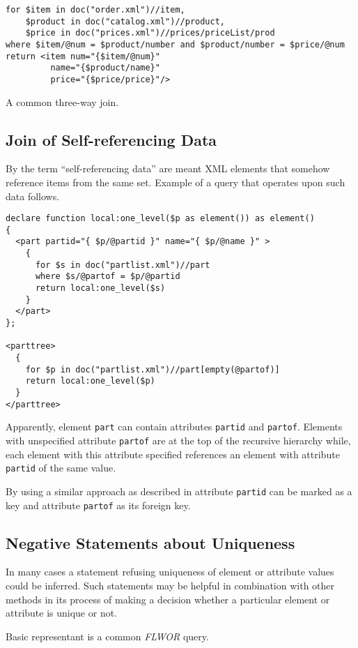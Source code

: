 \begin{verbatim}
for $item in doc("order.xml")//item, 
    $product in doc("catalog.xml")//product, 
    $price in doc("prices.xml")//prices/priceList/prod 
where $item/@num = $product/number and $product/number = $price/@num 
return <item num="{$item/@num}" 
         name="{$product/name}" 
         price="{$price/price}"/>
\end{verbatim}

A common three-way join.

\subsection{Join of Self-referencing Data}
By the term ``self-referencing data'' are meant XML elements that somehow reference items from the same set. Example of a query that operates upon such data follows.

\begin{verbatim}
declare function local:one_level($p as element()) as element()
{
  <part partid="{ $p/@partid }" name="{ $p/@name }" >
    {
      for $s in doc("partlist.xml")//part
      where $s/@partof = $p/@partid
      return local:one_level($s)
    }
  </part>
};

<parttree>
  {
    for $p in doc("partlist.xml")//part[empty(@partof)]
    return local:one_level($p)
  }
</parttree>
\end{verbatim}

Apparently, element \texttt{part} can contain attributes \texttt{partid} and \texttt{partof}. Elements with unspecified attribute \texttt{partof} are at the top of the recursive hierarchy while, each element with this attribute specified references an element with attribute \texttt{partid} of the same value.

By using a similar approach as described in \cite{Necasky:2009:DXK:1529282.1529414} attribute \texttt{partid} can be marked as a key and attribute \texttt{partof} as its foreign key.

\subsection{Negative Statements about Uniqueness}
In many cases a statement refusing uniqueness of element or attribute values could be inferred. Such statements may be helpful in combination with other methods in its process of making a decision whether a particular element or attribute is unique or not.

Basic representant is a common \emph{FLWOR} query.

